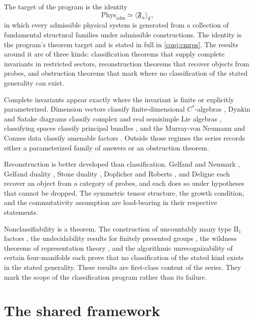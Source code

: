 \documentclass[11pt,letterpaper]{article}
\theoremstyle{definition}
\theoremstyle{remark}
\begin{document}
The target of the program is the identity
\[
  \mathrm{Phys}_{\mathrm{adm}} \simeq \langle \mathfrak{F}_\alpha \rangle_{\mathfrak{C}},
\]
in which every admissible physical system is generated from a collection of fundamental structural families under admissible constructions. The identity is the program's theorem target and is stated in full in \cref{conj:cmrps}. The results around it are of three kinds: classification theorems that supply complete invariants in restricted sectors, reconstruction theorems that recover objects from probes, and obstruction theorems that mark where no classification of the stated generality can exist.

Complete invariants appear exactly where the invariant is finite or explicitly parameterized. Dimension vectors classify finite-dimensional $C^*$-algebras \cite{corpus-9}, Dynkin and Satake diagrams classify complex and real semisimple Lie algebras \cite{corpus-4}, classifying spaces classify principal bundles \cite{corpus-17,corpus-18}, and the Murray-von Neumann and Connes data classify amenable factors \cite{corpus-62,corpus-64}. Outside those regimes the series records either a parameterized family of answers or an obstruction theorem.

Reconstruction is better developed than classification. Gelfand and Neumark \cite{corpus-42}, Gelfand duality \cite{corpus-43}, Stone duality \cite{corpus-44}, Doplicher and Roberts \cite{corpus-12,corpus-67}, and Deligne \cite{corpus-13} each recover an object from a category of probes, and each does so under hypotheses that cannot be dropped. The symmetric tensor structure, the growth condition, and the commutativity assumption are load-bearing in their respective statements.

Nonclassifiability is a theorem. The construction of uncountably many type $\mathrm{II}_1$ factors \cite{corpus-65}, the undecidability results for finitely presented groups \cite{corpus-53}, the wildness theorems of representation theory \cite{corpus-55,corpus-56,corpus-58}, and the algorithmic unrecognizability of certain four-manifolds \cite{corpus-54} each prove that no classification of the stated kind exists in the stated generality. These results are first-class content of the series. They mark the scope of the classification program rather than its failure.

\section{The shared framework}
\end{document}
